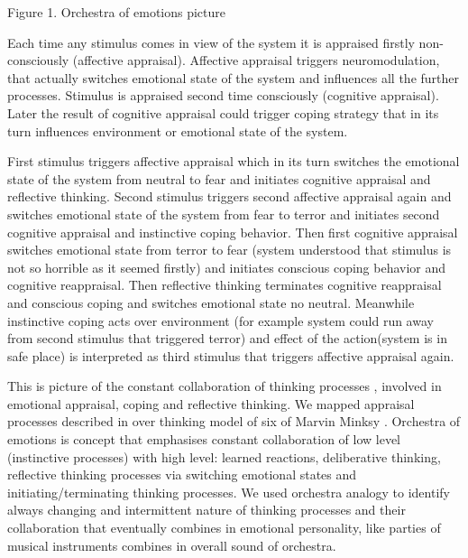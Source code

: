 \begin{center}
Figure 1. Orchestra of emotions picture
\end{center}

Each time any stimulus comes in view of the system it is appraised firstly non-consciously (affective appraisal). Affective appraisal triggers neuromodulation, that actually switches emotional state of the system and influences all the further processes. Stimulus is appraised second time consciously (cognitive appraisal). Later the result of cognitive appraisal could trigger coping strategy that in its turn influences environment or emotional state of the system.

First stimulus triggers affective appraisal which in its turn switches the emotional state of the system from neutral to fear and initiates cognitive appraisal and reflective thinking. Second stimulus triggers second affective appraisal again and switches emotional state of the system from fear to terror and initiates second cognitive appraisal and instinctive coping behavior. Then first cognitive appraisal switches emotional state from terror to fear (system understood that stimulus is not so horrible as it seemed firstly) and initiates conscious coping behavior and cognitive reappraisal. Then reflective thinking terminates cognitive reappraisal and conscious coping and switches emotional state no neutral. Meanwhile instinctive coping acts over environment (for example system could run away from second stimulus that triggered terror) and effect of the action(system is in safe place) is interpreted as third stimulus that triggers affective appraisal again.

This is picture of the constant collaboration of thinking processes \cite{emotionmachine}, involved in emotional appraisal, coping and reflective thinking. We mapped appraisal processes described in \cite{putting_appraisal_in_context, appraisal_determinants_of_emotions, appraisal_considered_as_a_process} over thinking model of six of Marvin Minksy \cite{emotionmachine}. Orchestra of emotions is concept that emphasises constant collaboration of low level (instinctive processes) with high level: learned reactions, deliberative thinking, reflective thinking processes via switching emotional states and initiating/terminating thinking processes. We used orchestra analogy to identify always changing and intermittent nature of thinking processes and their  collaboration that eventually combines in emotional personality, like parties of musical instruments combines in overall sound of orchestra.

